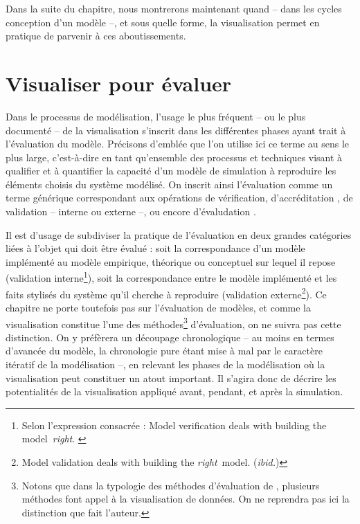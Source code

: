 \documentclass[a4paper, 12pt]{article}
\begin{document}
Dans la suite du chapitre, nous montrerons maintenant quand -- dans les cycles conception d'un modèle --, et sous quelle forme, la visualisation permet en pratique de parvenir à ces aboutissements.

\section{Visualiser pour évaluer}

Dans le processus de modélisation, l'usage le plus fréquent -- ou le plus documenté -- de la visualisation s'inscrit dans les différentes phases ayant trait à l'évaluation du modèle.
Précisons d'emblée que l'on utilise ici ce terme au sens le plus large, c'est-à-dire en tant qu'ensemble des processus et techniques visant à qualifier et à quantifier la capacité d'un modèle de simulation à reproduire les éléments choisis du système modélisé.
On inscrit ainsi l'évaluation comme un terme générique correspondant aux opérations de vérification, d'accréditation \autocite{balci_verification_1997}, de validation -- interne ou externe \autocite{amblard_evaluation_2006} --, ou encore d'\og évaludation\fg{} \autocite{augusiak_merging_2014}.

Il est d'usage de subdiviser la pratique de l'évaluation en deux grandes catégories liées à l'objet qui doit être évalué : soit la correspondance d'un modèle implémenté au modèle empirique, théorique ou conceptuel sur lequel il repose (validation interne\footnote{
Selon l'expression consacrée : \og Model verification deals with building the model~\textit{right}.\fg{} \autocite[\ppno~165]{balci_validation_1994}
}), soit la correspondance entre le modèle implémenté et les faits stylisés du système qu'il cherche à reproduire (validation externe\footnote{
\og Model validation deals with building the \textit{right}~model.\fg{} (\textit{ibid.})
}).
Ce chapitre ne porte toutefois pas sur l'évaluation de modèles, et comme la visualisation constitue l'une des méthodes\footnote{
Notons que dans la typologie des méthodes d'évaluation de \textcite{balci_verification_1997}, plusieurs méthodes font appel à la visualisation de données. On ne reprendra pas ici la distinction que fait l'auteur.
} d'évaluation, on ne suivra pas cette distinction.
On y préfèrera un découpage chronologique -- au moins en termes d'avancée du modèle, la chronologie pure étant mise à mal par le caractère itératif de la modélisation --, en relevant les phases de la modélisation où la visualisation peut constituer un atout important.
Il s'agira donc de décrire les potentialités de la visualisation appliqué avant, pendant, et après la simulation.
\end{document}
